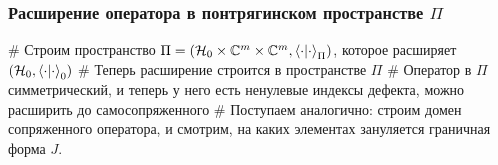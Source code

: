 \documentclass{beamer}
\begin{document}






\begin{frame}[fragile]
\frametitle{Расширение оператора в понтрягинском пространстве $\Pi$}
\begin{easylist}[itemize]
# Строим пространство $\Pi = (\hilb{0} \times \bbC^m \times \bbC^m, \ip{\cdot}{\cdot}_\Pi)$, которое расширяет $(\hilb{0}, \ip{\cdot}{\cdot}_0)$
# Теперь расширение строится в пространстве $\Pi$
# Оператор в $\Pi$ симметрический, и теперь у него есть ненулевые индексы дефекта, можно расширить до самосопряженного
# Поступаем аналогично: строим домен сопряженного оператора, и смотрим, на каких элементах зануляется граничная форма $J$. 
\end{easylist}
\end{frame}
\end{document}
